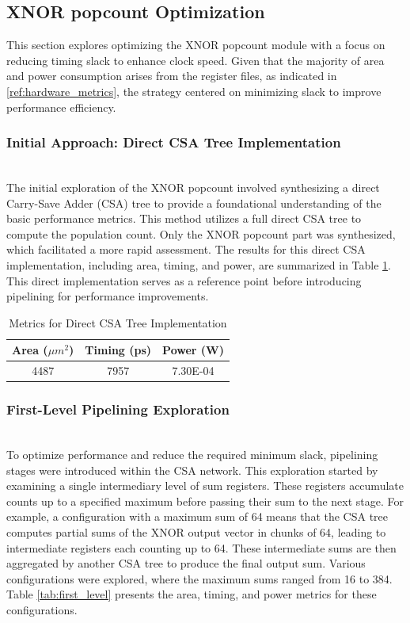 \documentclass[conference]{IEEEtran}
\begin{document}
\subsection{XNOR popcount Optimization}
\label{ref:xnor_popcount}

This section explores optimizing the XNOR popcount module with a focus on reducing timing slack to enhance clock speed. Given that the majority of area and power consumption arises from the register files, as indicated in \ref{ref:hardware_metrics}, the strategy centered on minimizing slack to improve performance efficiency.

\subsubsection{Initial Approach: Direct CSA Tree Implementation}
\hfill\\

The initial exploration of the XNOR popcount involved synthesizing a direct Carry-Save Adder (CSA) tree to provide a foundational understanding of the basic performance metrics. This method utilizes a full direct CSA tree to compute the population count. Only the XNOR popcount part was synthesized, which facilitated a more rapid assessment. The results for this direct CSA implementation, including area, timing, and power, are summarized in Table \ref{tab:direct_csa}. This direct implementation serves as a reference point before introducing pipelining for performance improvements.


\begin{table}[h]
    \centering
    \caption{Metrics for Direct CSA Tree Implementation}
    \label{tab:direct_csa}
    \begin{tabular}{@{}ccc@{}}
        \toprule
        \textbf{Area ($\mu m^2$)} & \textbf{Timing (ps)} & \textbf{Power (W)} \\
        \midrule
          4487 & 7957 & 7.30E-04 \\
        \bottomrule
    \end{tabular}
\end{table}


\subsubsection{First-Level Pipelining Exploration}
\hfill\\

To optimize performance and reduce the required minimum slack, pipelining stages were introduced within the CSA network. This exploration started by examining a single intermediary level of sum registers. These registers accumulate counts up to a specified maximum before passing their sum to the next stage. For example, a configuration with a maximum sum of 64 means that the CSA tree computes partial sums of the XNOR output vector in chunks of 64, leading to intermediate registers each counting up to 64. These intermediate sums are then aggregated by another CSA tree to produce the final output sum. Various configurations were explored, where the maximum sums ranged from 16 to 384. Table \ref{tab:first_level} presents the area, timing, and power metrics for these configurations.
\end{document}
